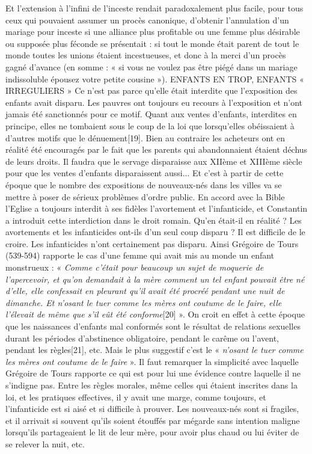  Et l'extension à l'infini de l'inceste rendait paradoxalement plus facile, pour tous ceux qui pouvaient assumer un procès canonique, d'obtenir l'annulation d'un mariage pour inceste si une alliance plus profitable ou une femme plus désirable ou supposée plus féconde se présentait : si tout le monde était parent de tout le monde toutes les unions étaient incestueuses, et donc à la merci d'un procès gagné d'avance (en somme : « si vous ne voulez pas être piégé dans un mariage indissoluble épousez votre petite cousine »). 
ENFANTS EN TROP, ENFANTS « IRREGULIERS »
 Ce n'est pas parce qu'elle était interdite que l'exposition des enfants avait disparu. Les pauvres ont toujours eu recours à l'exposition et n'ont jamais été sanctionnés pour ce motif. Quant aux ventes d'enfants, interdites en principe, elles ne tombaient sous le coup de la loi que lorsqu'elles obéissaient à d'autres motifs que le dénuement[19]. Bien au contraire les acheteurs ont en réalité été encouragés par le fait que les parents qui abandonnaient étaient déchus de leurs droits. Il faudra que le servage disparaisse aux XIIème et XIIIème siècle pour que les ventes d'enfants disparaissent aussi... Et c'est à partir de cette époque que le nombre des expositions de nouveaux-nés dans les villes va se mettre à poser de sérieux problèmes d'ordre public.
 En accord avec la Bible l'Eglise a toujours interdit à ses fidèles l'avortement et l'infanticide, et Constantin a introduit cette interdiction dans le droit romain. Qu'en était-il en réalité ? Les avortements et les infanticides ont-ils d'un seul coup disparu ? Il est difficile de le croire. Les infanticides n'ont certainement pas disparu. Ainsi Grégoire de Tours (539-594) rapporte le cas d'une femme qui avait mis au monde un enfant monstrueux : « \emph{Comme c'était pour beaucoup un sujet de moquerie de l'apercevoir, et qu'on demandait à la mère comment un tel enfant pouvait être né d'elle, elle confessait en pleurant qu'il avait été procréé pendant une nuit de dimanche. Et n'osant le tuer comme les mères ont coutume de le faire, elle l'élevait de même que s'il eût été conforme}[20]\emph{} ». On croit en effet à cette époque que les naissances d'enfants mal conformés sont le résultat de relations sexuelles durant les périodes d'abstinence obligatoire, pendant le carême ou l'avent, pendant les règles[21], etc.
 Mais le plus suggestif c'est le « \emph{n'osant le tuer comme les mères ont coutume de le faire} ». Il faut remarquer la simplicité avec laquelle Grégoire de Tours rapporte ce qui est pour lui une évidence contre laquelle il ne s'indigne pas. Entre les règles morales, même celles qui étaient inscrites dans la loi, et les pratiques effectives, il y avait une marge, comme toujours, et l'infanticide est si aisé et si difficile à prouver. Les nouveaux-nés sont si fragiles, et il arrivait si souvent qu'ils soient étouffés par mégarde sans intention maligne lorsqu'ils partageaient le lit de leur mère, pour avoir plus chaud ou lui éviter de se relever la nuit, etc. 
